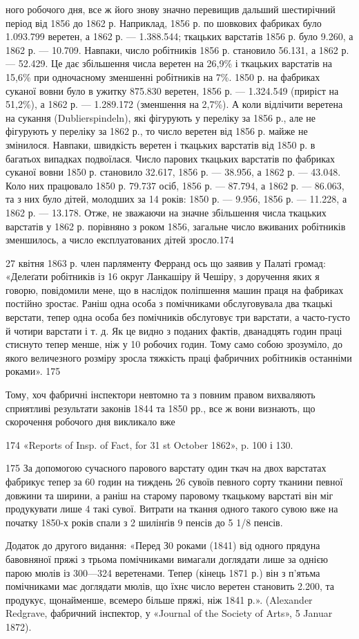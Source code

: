 ного робочого дня, все ж його знову значно перевищив дальший
шестирічний період від 1856 до 1862 р. Наприклад, 1856 р. по
шовкових фабриках було 1.093.799 веретен, а 1862 р. — 1.388.544;
ткацьких варстатів 1856 р. було 9.260, а 1862 р. — 10.709. Навпаки,
число робітників 1856 р. становило 56.131, а 1862 р. — 52.429.
Це дає збільшення числа веретен на 26,9\% і ткацьких варстатів
на 15,6\% при одночасному зменшенні робітників на 7\%. 1850 р. на
фабриках суканої вовни було в ужитку 875.830 веретен, 1856 р. —
1.324.549 (приріст на 51,2\%), а 1862 р. — 1.289.172 (зменшення
на 2,7\%). А коли відлічити веретена на сукання (Dublierspindeln),
які фігурують у переліку за 1856 р., але не фігурують у переліку
за 1862 р., то число веретен від 1856 р. майже не змінилося. Навпаки,
швидкість веретен і ткацьких варстатів від 1850 р. в
багатьох випадках подвоїлася. Число парових ткацьких варстатів
по фабриках суканої вовни 1850 р. становило 32.617,
1856 р. — 38.956, а 1862 р. — 43.048. Коло них працювало 1850 р.
79.737 осіб, 1856 р. — 87.794, а 1862 р. — 86.063, та з них було
дітей, молодших за 14 років: 1850 р. — 9.956, 1856 р. — 11.228,
а 1862 р. — 13.178. Отже, не зважаючи на значне збільшення
числа ткацьких варстатів у 1862 р. порівняно з роком 1856, загальне
число вживаних робітників зменшилось, а число експлуатованих
дітей зросло.174

27 квітня 1863 р. член парляменту Ферранд ось що заявив у
Палаті громад: «Делеґати робітників із 16 округ Ланкашіру й
Чешіру, з доручення яких я говорю, повідомили мене, що в наслідок
поліпшення машин праця на фабриках постійно зростає.
Раніш одна особа з помічниками обслуговувала два ткацькі верстати,
тепер одна особа без помічників обслуговує три варстати,
а часто-густо й чотири варстати і т. д. Як це видно з поданих
фактів, дванадцять годин праці стиснуто тепер менше, ніж у
10 робочих годин. Тому само собою зрозуміло, до якого величезного
розміру зросла тяжкість праці фабричних робітників останніми
роками». 175

Тому, хоч фабричні інспектори невтомно та з повним правом
вихваляють сприятливі результати законів 1844 та 1850 рр.,
все ж вони визнають, що скорочення робочого дня викликало вже

174 «Reports of Insp. of Fact, for 31 st October 1862», p. 100 і 130.

175 За допомогою сучасного парового варстату один ткач на двох
варстатах фабрикує тепер за 60 годин на тиждень 26 сувоїв певного сорту
тканини певної довжини та ширини, а раніш на старому паровому ткацькому
варстаті він міг продукувати лише 4 такі сувої. Витрати на ткання
одного такого сувою вже на початку 1850-х років спали з 2 шилінґів
9 пенсів до 5 1/8 пенсів.

Додаток до другого видання: «Перед З0 роками (1841) від одного прядуна
бавовняної пряжі з трьома помічниками вимагали доглядати лише
за однією парою мюлів із 300—324 веретенами. Тепер (кінець 1871 р.)
він з п’ятьма помічниками має доглядати мюлів, що їхнє число веретен
становить 2.200, та продукує, щонайменше, всемеро більше пряжі, ніж
1841 р.». (Alexander Redgrave, фабричний інспектор, у «Journal of
the Society of Arts», 5 Januar 1872).
